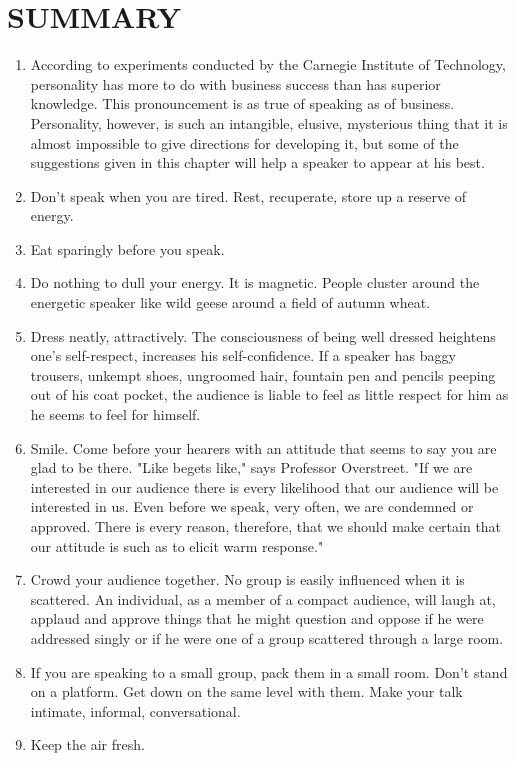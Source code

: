 \documentclass[10pt]{article}
\begin{document}
\section*{SUMMARY}
\begin{enumerate}
  \item According to experiments conducted by the Carnegie Institute of Technology, personality has more to do with business success than has superior knowledge. This pronouncement is as true of speaking as of business. Personality, however, is such an intangible, elusive, mysterious thing that it is almost impossible to give directions for developing it, but some of the suggestions given in this chapter will help a speaker to appear at his best.
  \item Don't speak when you are tired. Rest, recuperate, store up a reserve of energy.
  \item Eat sparingly before you speak.
  \item Do nothing to dull your energy. It is magnetic. People cluster around the energetic speaker like wild geese around a field of autumn wheat.
  \item Dress neatly, attractively. The consciousness of being well dressed heightens one's self-respect, increases his self-confidence. If a speaker has baggy trousers, unkempt shoes, ungroomed hair, fountain pen and pencils peeping out of his coat pocket, the audience is liable to feel as little respect for him as he seems to feel for himself.
  \item Smile. Come before your hearers with an attitude that seems to say you are glad to be there. "Like begets like," says Professor Overstreet. "If we are interested in our audience there is every likelihood that our audience will be interested in us. Even before we speak, very often, we are condemned or approved. There is every reason, therefore, that we should make certain that our attitude is such as to elicit warm response."
  \item Crowd your audience together. No group is easily influenced when it is scattered. An individual, as a member of a compact audience, will laugh at, applaud and approve things that he might question and oppose if he were addressed singly or if he were one of a group scattered through a large room.
  \item If you are speaking to a small group, pack them in a small room. Don't stand on a platform. Get down on the same level with them. Make your talk intimate, informal, conversational.
  \item Keep the air fresh.

\end{enumerate}
\end{document}
